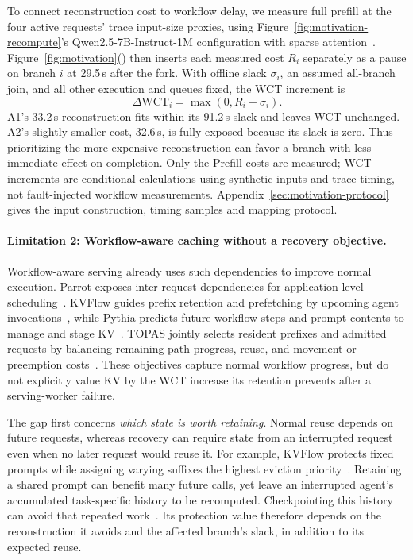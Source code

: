 To connect reconstruction cost to workflow delay, we measure full
prefill at the four active requests' trace input-size proxies, using
Figure~\ref{fig:motivation-recompute}'s Qwen2.5-7B-Instruct-1M
configuration with sparse attention~\cite{qwen2025qwen25oneM,jiang2024minference}.
Figure~\ref{fig:motivation}()
then inserts each measured cost $R_i$ separately as a pause on branch
$i$ at 29.5\,s after the fork. With offline slack $\sigma_i$, an assumed
all-branch join, and all other execution and queues fixed, the WCT
increment is
\[
  \Delta\mathrm{WCT}_i=\max(0,R_i-\sigma_i).
\]
A1's 33.2\,s reconstruction fits within its 91.2\,s slack and leaves WCT
unchanged. A2's slightly smaller cost, 32.6\,s, is fully exposed because
its slack is zero. Thus prioritizing the more expensive reconstruction
can favor a branch with less immediate effect on completion.
Only the Prefill costs are measured; WCT increments are conditional
calculations using synthetic inputs and trace timing, not fault-injected
workflow measurements. Appendix~\ref{sec:motivation-protocol} gives the
input construction, timing samples and mapping protocol.

\paragraph{Limitation 2: Workflow-aware caching without a recovery objective.}
Workflow-aware serving already uses such dependencies to improve normal
execution. Parrot exposes inter-request dependencies for application-level
scheduling~\cite{lin2024parrot}. KVFlow guides prefix retention and
prefetching by upcoming agent invocations~\cite{pan2025kvflow}, while Pythia
predicts future workflow steps and prompt contents to manage and stage
KV~\cite{yu2026pythia}. TOPAS jointly selects resident prefixes and admitted
requests by balancing remaining-path progress, reuse, and movement or
preemption costs~\cite{ni2026topas}. These objectives capture normal workflow
progress, but do not explicitly value KV by the WCT increase its retention
prevents after a serving-worker failure.

The gap first concerns \emph{which state is worth retaining}.
Normal reuse depends on future requests, whereas recovery can require
state from an interrupted request even when no later request would reuse
it. For example, KVFlow protects fixed prompts while assigning varying
suffixes the highest eviction priority~\cite{pan2025kvflow}.
Retaining a shared prompt can benefit many future calls, yet leave an
interrupted agent's accumulated task-specific history to be recomputed.
Checkpointing this history can avoid that repeated
work~\cite{strati2024dejavu}. Its protection value therefore depends on
the reconstruction it avoids and the affected branch's slack, in
addition to its expected reuse.

